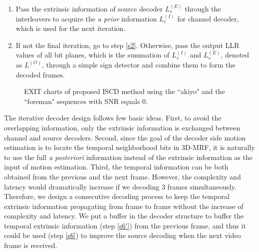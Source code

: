 \documentclass[10pt,twocolumn,twoside]{IEEEtran}
\begin{document}
\begin{enumerate}
\item \label{s7} Pass the extrinsic information of source decoder $L_s^{(E)}$ through the interleavers to acquire the {\it a prior} information $L_c^{(I)}$ for channel decoder, which is used for the next iteration.

\item If not the final iteration, go to step \ref{s2}. Otherwise, pass the output LLR values of all bit planes, which is the summation of $L_s^{(I)}$ and $L_s^{(E)}$, denoted as $L^{(O)}$,  through a simple sign detector and combine them to form the decoded frames.
\end{enumerate}

\begin{figure}[!t]
	\centering
	\caption{EXIT charts of proposed ISCD method using the ``akiyo" and the ``foreman" sequences with SNR equals $0$.}
	\label{fig_exit}
\end{figure}

The iterative decoder design follows few basic ideas. First, to avoid the overlapping information, only the extrinsic information is exchanged between channel and source decoders. Second, since the goal of the decoder side motion estimation is to locate the temporal neighborhood bits in 3D-MRF, it is naturally to use the full {\it a posteriori} information instead of the extrinsic information as the input of motion estimation. Third, the temporal information can be both obtained from the previous and the next frame. However, the complexity and latency would dramatically increase if we decoding $3$ frames simultaneously. Therefore, we design a consecutive decoding process to keep the temporal extrinsic information propagating from frame to frame without the increase of complexity and latency. We put a buffer in the decoder structure to buffer the temporal extrinsic information (step \ref{s6'}) from the previous frame, and thus it could be used (step \ref{s6}) to improve the source decoding when the next video frame is received.
\end{document}
